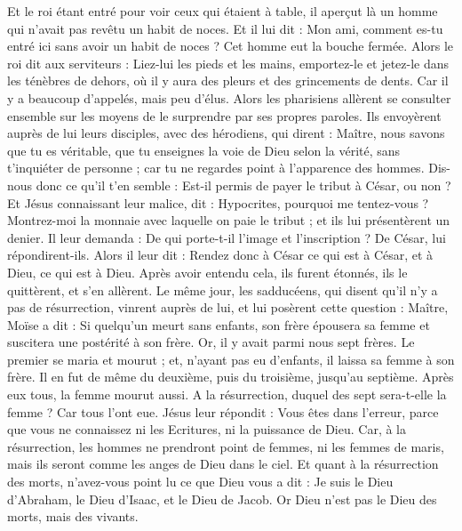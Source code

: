 \begin{multicols}{2}
Et le roi étant entré pour voir ceux qui étaient à table, il aperçut là un homme qui n’avait pas revêtu un habit de noces{}.
Et il lui dit : Mon ami, comment es-tu entré ici sans avoir un habit de noces ? Cet homme eut la bouche fermée.
Alors le roi dit aux serviteurs : Liez-lui les pieds et les mains, emportez-le et jetez-le dans les ténèbres de dehors, où il y aura des pleurs et des grincements de dents.
Car il y a beaucoup d'appelés, mais peu d'élus.
Alors les pharisiens allèrent se consulter ensemble sur les moyens de le surprendre par ses propres paroles.
Ils envoyèrent auprès de lui leurs disciples, avec des hérodiens, qui dirent : Maître, nous savons que tu es véritable, que tu enseignes la voie de Dieu selon la vérité, sans t’inquiéter de personne ; car tu ne regardes point à l'apparence des hommes.
Dis-nous donc ce qu'il t’en semble : Est-il permis de payer le tribut à César, ou non ?
Et Jésus connaissant leur malice, dit : Hypocrites, pourquoi me tentez-vous ?
Montrez-moi la monnaie avec laquelle on paie le tribut ; et ils lui présentèrent un denier.
Il leur demanda : De qui porte-t-il l’image et l’inscription ?
De César, lui répondirent-ils. Alors il leur dit : Rendez donc à César ce qui est à César, et à Dieu, ce qui est à Dieu.
Après avoir entendu cela, ils furent étonnés, ils le quittèrent, et s’en allèrent.
Le même jour, les sadducéens, qui disent qu'il n'y a pas de résurrection, vinrent auprès de lui, et lui posèrent cette question :
Maître, Moïse a dit : Si quelqu'un meurt sans enfants, son frère épousera sa femme et suscitera une postérité à son frère.
Or, il y avait parmi nous sept frères. Le premier se maria et mourut ; et, n'ayant pas eu d'enfants, il laissa sa femme à son frère.
Il en fut de même du deuxième, puis du troisième, jusqu’au septième.
Après eux tous, la femme mourut aussi.
A la résurrection, duquel des sept sera-t-elle la femme ? Car tous l'ont eue.
Jésus leur répondit : Vous êtes dans l’erreur, parce que vous ne connaissez ni les Ecritures, ni la puissance de Dieu.
Car, à la résurrection, les hommes ne prendront point de femmes, ni les femmes de maris, mais ils seront comme les anges de Dieu dans le ciel.
Et quant à la résurrection des morts, n'avez-vous point lu ce que Dieu vous a dit :
Je suis le Dieu d'Abraham, le Dieu d'Isaac, et le Dieu de Jacob{}. Or Dieu n'est pas le Dieu des morts, mais des vivants.

\end{multicols}
